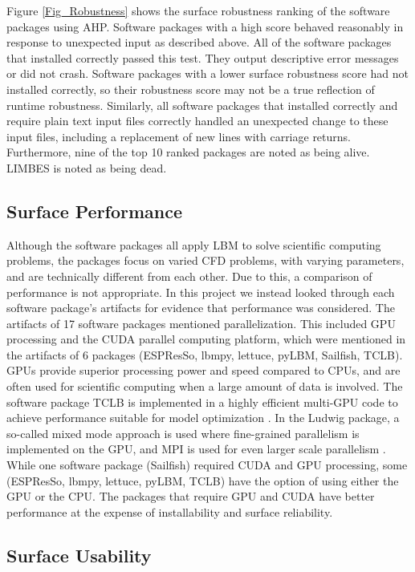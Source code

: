 \documentclass[12pt, notitlepage]{article}
\begin{document}
Figure \ref{Fig_Robustness} shows the surface robustness ranking of the software packages using AHP. Software packages with a high score behaved reasonably in response to unexpected input as described above. All of the software packages that installed correctly passed this test. They output descriptive error messages or did not crash. Software packages with a lower surface robustness score had not installed correctly, so their robustness score may not be a true reflection of runtime robustness. Similarly, all software packages that installed correctly and require plain text input files correctly handled an unexpected change to these input files, including a replacement of new lines with carriage returns. Furthermore, nine of the top 10 ranked packages are noted as being alive. LIMBES is noted as being dead.

\subsection{Surface Performance}

Although the software packages all apply LBM to solve scientific computing problems, the packages focus on varied CFD problems, with varying parameters, and are technically different from each other. Due to this, a comparison of performance is not appropriate. In this project we instead looked through each software package's artifacts for evidence that performance was considered. The artifacts of 17 software packages mentioned parallelization. This included GPU processing and the CUDA parallel computing platform, which were mentioned in the artifacts of 6 packages (ESPResSo, lbmpy, lettuce, pyLBM, Sailfish, TCLB). GPUs provide superior processing power and speed compared to CPUs, and are often used for scientific computing when a large amount of data is involved. The software package TCLB is implemented in a highly efficient multi-GPU code to achieve performance suitable for model optimization \citep{rutkowski2020open}. In the Ludwig package, a so-called mixed mode approach is used where fine-grained parallelism is implemented on the GPU, and MPI is used for even larger scale parallelism \citep{gray2013ludwig}. While one software package (Sailfish) required CUDA and GPU processing, some (ESPResSo, lbmpy, lettuce, pyLBM, TCLB) have the option of using either the GPU or the CPU. The packages that require GPU and CUDA have better performance at the expense of installability and surface reliability.

\subsection{Surface Usability}
\end{document}
